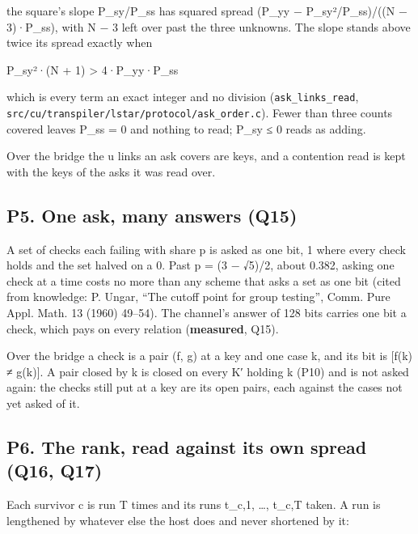 the square's slope P\_\allowbreak{}sy/P\_\allowbreak{}ss has squared spread (P\_\allowbreak{}yy − P\_\allowbreak{}sy²/P\_\allowbreak{}ss)/((N − 3)·P\_\allowbreak{}ss), with N − 3 left over past the three unknowns. The slope stands above twice its spread exactly when

P\_\allowbreak{}sy²·(N + 1) > 4·P\_\allowbreak{}yy·P\_\allowbreak{}ss

which is every term an exact integer and no division (\texttt{ask\_\allowbreak{}links\_\allowbreak{}read}, \texttt{src/\allowbreak{}cu/\allowbreak{}transpiler/\allowbreak{}lstar/\allowbreak{}protocol/\allowbreak{}ask\_\allowbreak{}order.\allowbreak{}c}). Fewer than three counts covered leaves P\_\allowbreak{}ss = 0 and nothing to read; P\_\allowbreak{}sy ≤ 0 reads as adding.

Over the bridge the u links an ask covers are keys, and a contention read is kept with the keys of the asks it was read over.

\subsection{\texorpdfstring{P5. One ask, many answers (Q15)}{P5. One ask, many answers (Q15)}}

A set of checks each failing with share p is asked as one bit, 1 where every check holds and the set halved on a 0. Past p = (3 − √5)/2, about 0.382, asking one check at a time costs no more than any scheme that asks a set as one bit (cited from knowledge: P. Ungar, “The cutoff point for group testing”, Comm. Pure Appl. Math. 13 (1960) 49–54). The channel's answer of 128 bits carries one bit a check, which pays on every relation (\textbf{measured}, Q15).

Over the bridge a check is a pair (f, g) at a key and one case k, and its bit is [f(k) ≠ g(k)]. A pair closed by k is closed on every K′ holding k (P10) and is not asked again: the checks still put at a key are its open pairs, each against the cases not yet asked of it.

\subsection{\texorpdfstring{P6. The rank, read against its own spread (Q16, Q17)}{P6. The rank, read against its own spread (Q16, Q17)}}

Each survivor c is run T times and its runs t\_\allowbreak{}c,1, …, t\_\allowbreak{}c,T taken. A run is lengthened by whatever else the host does and never shortened by it:

